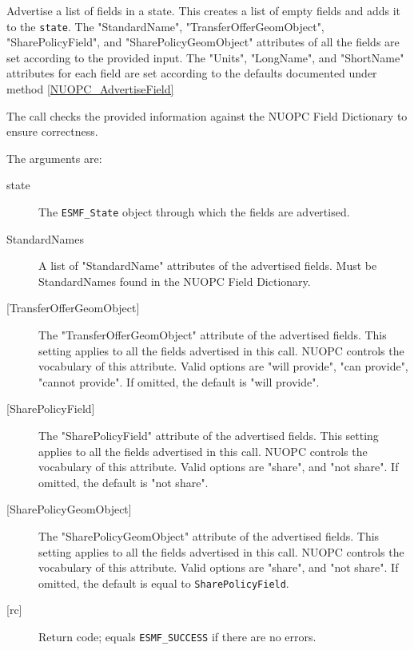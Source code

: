      \label{NUOPC_AdvertiseFields}
     Advertise a list of fields in a state. This creates a list of empty fields
     and adds it to the {\tt state}. The "StandardName", "TransferOfferGeomObject",
     "SharePolicyField", and "SharePolicyGeomObject" attributes of all the 
     fields are set according to the provided input. The "Units", "LongName",
     and "ShortName" attributes for each field are set according to the defaults
     documented under method \ref{NUOPC_AdvertiseField}
  
     The call checks the provided information against the NUOPC Field Dictionary
     to ensure correctness.
  
     The arguments are:
     \begin{description}
     \item[state]
       The {\tt ESMF\_State} object through which the fields are advertised.
     \item[StandardNames]
       A list of "StandardName" attributes of the advertised fields. Must be 
       StandardNames found in the  NUOPC Field Dictionary.
     \item[{[TransferOfferGeomObject]}]
       The "TransferOfferGeomObject" attribute of the advertised fields. This 
       setting applies to all the fields advertised in this call. NUOPC 
       controls the vocabulary of this attribute. Valid options are 
       "will provide", "can provide", "cannot provide".
       If omitted, the default is "will provide".
     \item[{[SharePolicyField]}]
       The "SharePolicyField" attribute of the advertised fields. This 
       setting applies to all the fields advertised in this call. NUOPC 
       controls the vocabulary of this attribute. Valid options are 
       "share", and "not share".
       If omitted, the default is "not share".
     \item[{[SharePolicyGeomObject]}]
       The "SharePolicyGeomObject" attribute of the advertised fields. This 
       setting applies to all the fields advertised in this call. NUOPC 
       controls the vocabulary of this attribute. Valid options are 
       "share", and "not share".
       If omitted, the default is equal to {\tt SharePolicyField}.
     \item[{[rc]}]
       Return code; equals {\tt ESMF\_SUCCESS} if there are no errors.
     \end{description}
   
 
